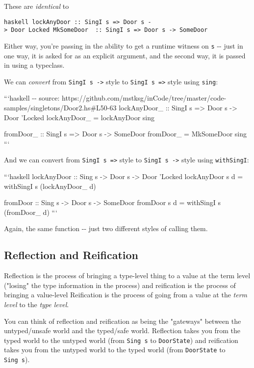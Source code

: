 \documentclass[]{article}
\begin{document}
These are \emph{identical} to

\texttt{haskell\ lockAnyDoor\ ::\ SingI\ s\ =\textgreater{}\ Door\ s\ -\textgreater{}\ Door\ \textquotesingle{}Locked\ MkSomeDoor\ \ ::\ SingI\ s\ =\textgreater{}\ Door\ s\ -\textgreater{}\ SomeDoor}

Either way, you're passing in the ability to get a runtime witness on \texttt{s}
-\/- just in one way, it is asked for as an explicit argument, and the second
way, it is passed in using a typeclass.

We can \emph{convert} from \texttt{SingI\ s\ -\textgreater{}} style to
\texttt{SingI\ s\ =\textgreater{}} style using \texttt{sing}:

```haskell -\/- source:
https://github.com/mstksg/inCode/tree/master/code-samples/singletons/Door2.hs\#L50-63
lockAnyDoor\_ :: SingI s =\textgreater{} Door s -\textgreater{} Door 'Locked
lockAnyDoor\_ = lockAnyDoor sing

fromDoor\_ :: SingI s =\textgreater{} Door s -\textgreater{} SomeDoor fromDoor\_
= MkSomeDoor sing ```

And we can convert from \texttt{SingI\ s\ =\textgreater{}} style to
\texttt{SingI\ s\ -\textgreater{}} style using \texttt{withSingI}:

```haskell lockAnyDoor :: Sing s -\textgreater{} Door s -\textgreater{} Door
'Locked lockAnyDoor s d = withSingI s (lockAnyDoor\_ d)

fromDoor :: Sing s -\textgreater{} Door s -\textgreater{} SomeDoor fromDoor s d
= withSingI s (fromDoor\_ d) ```

Again, the same function -\/- just two different styles of calling them.

\subsection{Reflection and Reification}

Reflection is the process of bringing a type-level thing to a value at the term
level ("losing" the type information in the process) and reification is the
process of bringing a value-level Reification is the process of going from a
value at the \emph{term level} to the \emph{type level}.

You can think of reflection and reification as being the "gateways" between the
untyped/unsafe world and the typed/safe world. Reflection takes you from the
typed world to the untyped world (from \texttt{Sing\ s} to \texttt{DoorState})
and reification takes you from the untyped world to the typed world (from
\texttt{DoorState} to \texttt{Sing\ s}).
\end{document}
